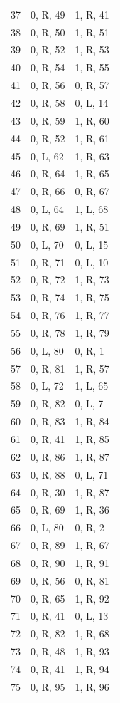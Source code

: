 \begin{longtable}{@{}rll@{}}
37 & 0, R, 49 & 1, R, 41\\
38 & 0, R, 50 & 1, R, 51\\
39 & 0, R, 52 & 1, R, 53\\
40 & 0, R, 54 & 1, R, 55\\
41 & 0, R, 56 & 0, R, 57\\
42 & 0, R, 58 & 0, L, 14\\
43 & 0, R, 59 & 1, R, 60\\
44 & 0, R, 52 & 1, R, 61\\
45 & 0, L, 62 & 1, R, 63\\
46 & 0, R, 64 & 1, R, 65\\
47 & 0, R, 66 & 0, R, 67\\
48 & 0, L, 64 & 1, L, 68\\
49 & 0, R, 69 & 1, R, 51\\
50 & 0, L, 70 & 0, L, 15\\
51 & 0, R, 71 & 0, L, 10\\
52 & 0, R, 72 & 1, R, 73\\
53 & 0, R, 74 & 1, R, 75\\
54 & 0, R, 76 & 1, R, 77\\
55 & 0, R, 78 & 1, R, 79\\
56 & 0, L, 80 & 0, R, 1\\
57 & 0, R, 81 & 1, R, 57\\
58 & 0, L, 72 & 1, L, 65\\
59 & 0, R, 82 & 0, L, 7\\
60 & 0, R, 83 & 1, R, 84\\
61 & 0, R, 41 & 1, R, 85\\
62 & 0, R, 86 & 1, R, 87\\
63 & 0, R, 88 & 0, L, 71\\
64 & 0, R, 30 & 1, R, 87\\
65 & 0, R, 69 & 1, R, 36\\
66 & 0, L, 80 & 0, R, 2\\
67 & 0, R, 89 & 1, R, 67\\
68 & 0, R, 90 & 1, R, 91\\
69 & 0, R, 56 & 0, R, 81\\
70 & 0, R, 65 & 1, R, 92\\
71 & 0, R, 41 & 0, L, 13\\
72 & 0, R, 82 & 1, R, 68\\
73 & 0, R, 48 & 1, R, 93\\
74 & 0, R, 41 & 1, R, 94\\
75 & 0, R, 95 & 1, R, 96\\

\end{longtable}
